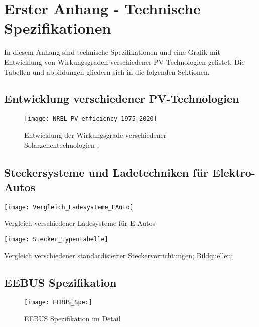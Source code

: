 \chapter{Erster Anhang - Technische Spezifikationen}
\label{Kap:Anhang1}
In diesem Anhang sind technische Spezifikationen und eine Grafik mit Entwicklung von Wirkungsgraden verschiedener PV-Technologien gelistet. Die Tabellen und abbildungen gliedern sich in die folgenden Sektionen.

\section{Entwicklung verschiedener PV-Technologien}

\begin{landscape}
  \begin{figure}[h]
      \centering
      \texttt{[image: NREL\_PV\_efficiency\_1975\_2020]}
      \caption{Entwicklung der Wirkungsgrade verschiedener Solarzellentechnologien \cite{Comparison_Batteries_2015}, \cite{NREL_PV_eta}}
      \label{Abb:Vgl_PV_eta}
  \end{figure}
\end{landscape}

\begin{landscape}
\section{Steckersysteme und Ladetechniken für Elektro-Autos}
  \begin{table}[h]
      \centering
      \texttt{[image: Vergleich\_Ladesysteme\_EAuto]}
      \caption{Vergleich verschiedener Ladesysteme für E-Autos \cite[S.15]{Emobility_StatusQuo_2016}} 
      \label{Tab:Vgl_Ladesysteme_EAuto}
  \end{table}
\end{landscape}

  \begin{table}[h]
      \centering
      \texttt{[image: Stecker\_typentabelle]}
      \caption{Vergleich verschiedener standardisierter Steckervorrichtungen; Bildquellen:\cite{Abb_Steck_Schuko}\cite{Abb_Steck_CEE}\cite{Abb_Steck_Typ1}\cite{Abb_Steck_Typ2}\cite{Abb_Steck_Combo1}\cite{Abb_Steck_Combo2}\cite{Abb_Steck_CHAdeMO}}
      \label{Tab:Vgl_Steckervorrichtungen}
  \end{table}	

\begin{landscape}
\section{EEBUS Spezifikation}
  \begin{figure}[h]
      \centering
      \texttt{[image: EEBUS\_Spec]}
      \caption{EEBUS Spezifikation im Detail \cite[S.5]{EEBUS_Intro}}
      \label{Abb:EEBUS_Spec}
  \end{figure}			
\end{landscape}                

